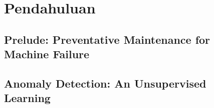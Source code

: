 \chapter{Pendahuluan}

\section{Prelude: Preventative Maintenance for Machine Failure}

\section{Anomaly Detection: An Unsupervised Learning}
